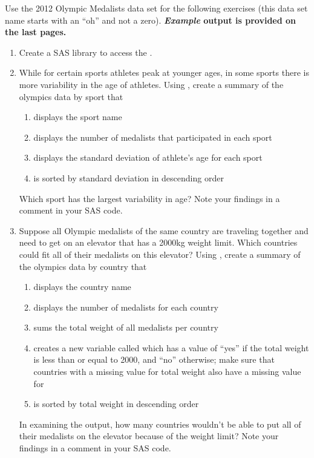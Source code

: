 


\vskip10pt

\noindent Use the 2012 Olympic Medalists data set  for the following exercises (this data set name starts with an ``oh'' and not a zero).  \textbf{\emph{Example} output is provided on the last pages.}
\begin{enumerate}
\item Create a SAS library to access the .
\item While for certain sports athletes peak at younger ages, in some sports there is more variability in the age of athletes.  Using , create a summary of the olympics data by sport that
\begin{enumerate}
\item displays the sport name
\item displays the number of medalists that participated in each sport
\item displays the standard deviation of athlete's age for each sport
\item is sorted by standard deviation in descending order
\end{enumerate}
Which sport has the largest variability in age?  Note your findings in a comment in your SAS code.
\item Suppose all Olympic medalists of the same country are traveling together and need to get on an elevator that has a 2000kg weight limit.  Which countries could fit all of their medalists on this elevator?  Using , create a summary of the olympics data by country that
\begin{enumerate}
\item displays the country name
\item displays the number of medalists for each country
\item sums the total weight of all medalists per country
\item creates a new variable called  which has a value of ``yes'' if the total weight is less than or equal to 2000, and ``no'' otherwise; make sure that countries with a missing value for total weight also have a missing value for 
\item is sorted by total weight in descending order
\end{enumerate}
In examining the output, how many countries wouldn't be able to put all of their medalists on the elevator because of the weight limit?  Note your findings in a comment in your SAS code.

\end{enumerate}
